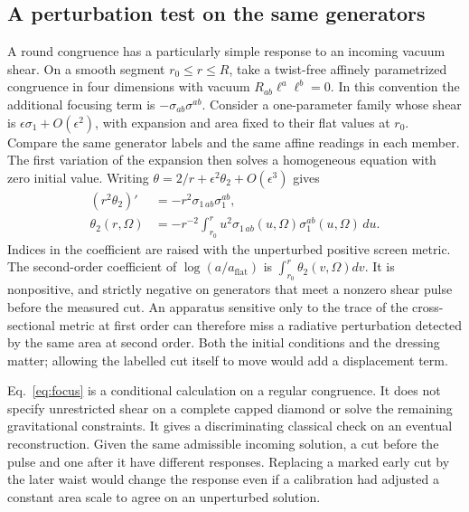 \documentclass[11pt,letterpaper]{article}
\begin{document}
\subsection{A perturbation test on the same generators}
A round congruence has a particularly simple response to an incoming
vacuum shear. On a smooth segment \(r_0\le r\le R\), take a twist-free
affinely parametrized congruence in four dimensions with vacuum
\(R_{ab}\ell^a\ell^b=0\). In this convention the additional focusing
term is \(-\sigma_{ab}\sigma^{ab}\). Consider a one-parameter family
whose shear is \(\epsilon\sigma_1+O(\epsilon^2)\), with expansion and
area fixed to their flat values at \(r_0\). Compare the same generator
labels and the same affine readings in each member. The first variation
of the expansion then solves a homogeneous equation with zero initial
value. Writing
\(\theta=2/r+\epsilon^2\theta_2+O(\epsilon^3)\) gives
\begin{align}
 (r^2\theta_2)'&=-r^2\sigma_{1\,ab}\sigma_1^{ab},\\
 \theta_2(r,\Omega)&=-r^{-2}\int_{r_0}^r
         u^2\sigma_{1\,ab}(u,\Omega)\sigma_1^{ab}(u,\Omega)\,du .
 \label{eq:focus}
\end{align}
Indices in the coefficient are raised with the unperturbed positive
screen metric. The second-order coefficient of
\(\log(a/a_{\mathrm{flat}})\) is \(\int_{r_0}^r\theta_2(v,\Omega)dv\).
It is nonpositive, and strictly negative on generators that meet
a nonzero shear pulse before the measured cut. An apparatus sensitive only
to the trace of the cross-sectional metric at first order can therefore
miss a radiative perturbation detected by the same area at second order.
Both the initial conditions and the dressing matter; allowing the labelled
cut itself to move would add a displacement term.

Eq.~\eqref{eq:focus} is a conditional calculation on a regular congruence.
It does not specify unrestricted shear on a complete capped diamond or
solve the remaining gravitational constraints. It gives a discriminating
classical check on an eventual reconstruction. Given the same admissible
incoming solution, a cut before the pulse and one after it have different
responses. Replacing a marked early cut by the later waist would change
the response even if a calibration had adjusted a constant area scale
to agree on an unperturbed solution.
\end{document}
